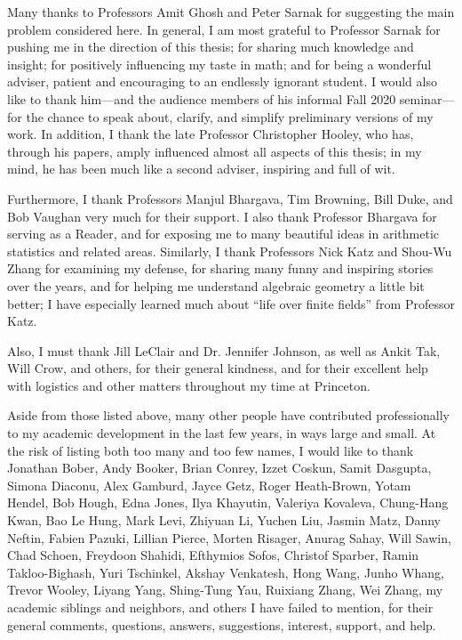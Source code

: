 \documentclass[12pt]{report}
\begin{document}
Many thanks to Professors Amit Ghosh and Peter Sarnak for suggesting the main problem considered here.
In general, I am most grateful to Professor Sarnak for pushing me in the direction of this thesis; for sharing much knowledge and insight; for positively influencing my taste in math; and for being a wonderful adviser, patient and encouraging to an endlessly ignorant student.
I would also like to thank him---and the audience members of his informal Fall 2020 seminar---for the chance to speak about, clarify, and simplify preliminary versions of my work.
In addition, I thank the late Professor Christopher Hooley, who has, through his papers, amply influenced almost all aspects of this thesis; in my mind, he has been much like a second adviser, inspiring and full of wit.

Furthermore, I thank Professors Manjul Bhargava, Tim Browning, Bill Duke, and Bob Vaughan very much for their support.
I also thank Professor Bhargava for serving as a Reader, and for exposing me to many beautiful ideas in arithmetic statistics and related areas.
Similarly, I thank Professors Nick Katz and Shou-Wu Zhang for examining my defense, for sharing many funny and inspiring stories over the years, and for helping me understand algebraic geometry a little bit better; I have especially learned much about ``life over finite fields'' from Professor Katz.

Also, I must thank Jill LeClair and Dr. Jennifer Johnson, as well as Ankit Tak, Will Crow, and others, for their general kindness, and for their excellent help with logistics and other matters throughout my time at Princeton.

Aside from those listed above, many other people have contributed professionally to my academic development in the last few years, in ways large and small.
At the risk of listing both too many and too few names,
I would like to thank
Jonathan Bober,
Andy Booker,
Brian Conrey,
Izzet Coskun,
Samit Dasgupta,
Simona Diaconu,
Alex Gamburd,
Jayce Getz,
Roger Heath-Brown,
Yotam Hendel,
Bob Hough,
Edna Jones,
Ilya Khayutin,
Valeriya Kovaleva,
Chung-Hang Kwan,
Bao Le Hung,
Mark Levi,
Zhiyuan Li,
Yuchen Liu,
Jasmin Matz,
Danny Neftin,
Fabien Pazuki,
Lillian Pierce,
Morten Risager,
Anurag Sahay,
Will Sawin,
Chad Schoen,
Freydoon Shahidi,
Efthymios Sofos,
Christof Sparber,
Ramin Takloo-Bighash,
Yuri Tschinkel,
Akshay Venkatesh,
Hong Wang,
Junho Whang,
Trevor Wooley,
Liyang Yang,
Shing-Tung Yau,
Ruixiang Zhang,
Wei Zhang,
my academic siblings and neighbors,
and others I have failed to mention,
for their general comments, questions, answers, suggestions, interest, support, and help.
\end{document}
